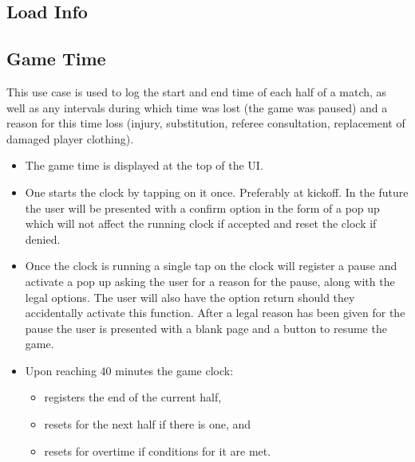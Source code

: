 \documentclass[hidelinks,a4paper,12pt]{article}
\begin{document}
	\subsection{Load Info}

	\subsection{Game Time}
	This use case is used to log the start and end time of each half of a match, as well as any intervals during which time was lost (the game was paused) and a reason for this time loss (injury, substitution, referee consultation, replacement of damaged player clothing). 
	\begin{itemize}Usage:
		\item The game time is displayed at the top of the UI.
		\item One starts the clock by tapping on it once. Preferably at kickoff. In the future the user will be presented with a confirm option in the form of a pop up which will not affect the running clock if accepted and reset the clock if denied.
		\item Once the clock is running a single tap on the clock will register a pause and activate a pop up asking the user for a reason for the pause, along with the legal options. The user will also have the option return should they accidentally activate this function. After a legal reason has been given for the pause the user is presented with a blank page and a button to resume the game.
		\item Upon reaching 40 minutes the game clock:
		\begin{itemize}
		\item registers the end of the current half,
		\item resets for the next half if there is one, and
		\item resets for overtime if conditions for it are met.
		\end{itemize}
	\end{itemize}
\end{document}
